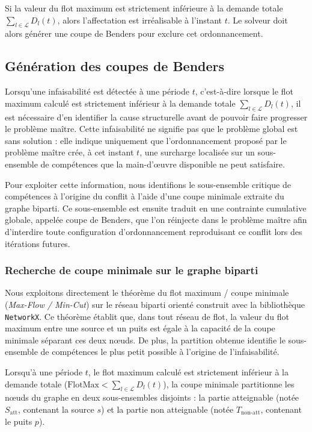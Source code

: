 \bigskip

Si la valeur du flot maximum est strictement inférieure à la demande totale $\sum_{l \in \mathcal{L}} D_l(t)$, alors l'affectation est irréalisable à l'instant $t$. Le solveur doit alors générer une coupe de Benders pour exclure cet ordonnancement.

\subsection{Génération des coupes de Benders}
Lorsqu'une infaisabilité est détectée à une période $t$, c'est-à-dire lorsque le flot maximum calculé est strictement inférieur à la demande totale $\sum_{l \in \mathcal{L}} D_l(t)$, il est nécessaire d'en identifier la cause structurelle avant de pouvoir faire progresser le problème maître. Cette infaisabilité ne signifie pas que le problème global est sans solution : elle indique uniquement que l'ordonnancement proposé par le problème maître crée, à cet instant $t$, une surcharge localisée sur un sous-ensemble de compétences que la main-d'œuvre disponible ne peut satisfaire.

Pour exploiter cette information, nous identifions le sous-ensemble critique de compétences à l'origine du conflit à l'aide d'une coupe minimale extraite du graphe biparti. Ce sous-ensemble est ensuite traduit en une contrainte cumulative globale, appelée coupe de Benders, que l'on réinjecte dans le problème maître afin d'interdire toute configuration d'ordonnancement reproduisant ce conflit lors des itérations futures.

\subsubsection{Recherche de coupe minimale sur le graphe biparti}

Nous exploitons directement le théorème du flot maximum / coupe minimale (\textit{Max-Flow / Min-Cut}) \cite{ford1956maximal} sur le réseau biparti orienté construit avec la bibliothèque \texttt{NetworkX}. Ce théorème établit que, dans tout réseau de flot, la valeur du flot maximum entre une source et un puits est égale à la capacité de la coupe minimale séparant ces deux nœuds. De plus, la partition obtenue identifie le sous-ensemble de compétences le plus petit possible à l'origine de l'infaisabilité.

Lorsqu'à une période $t$, le flot maximum calculé est strictement inférieur à la demande totale ($\text{FlotMax} < \sum_{l \in \mathcal{L}} D_l(t)$), la coupe minimale partitionne les nœuds du graphe en deux sous-ensembles disjoints : la partie atteignable (notée $S_{\text{att}}$, contenant la source $s$) et la partie non atteignable (notée $T_{\text{non-att}}$, contenant le puits $p$).

